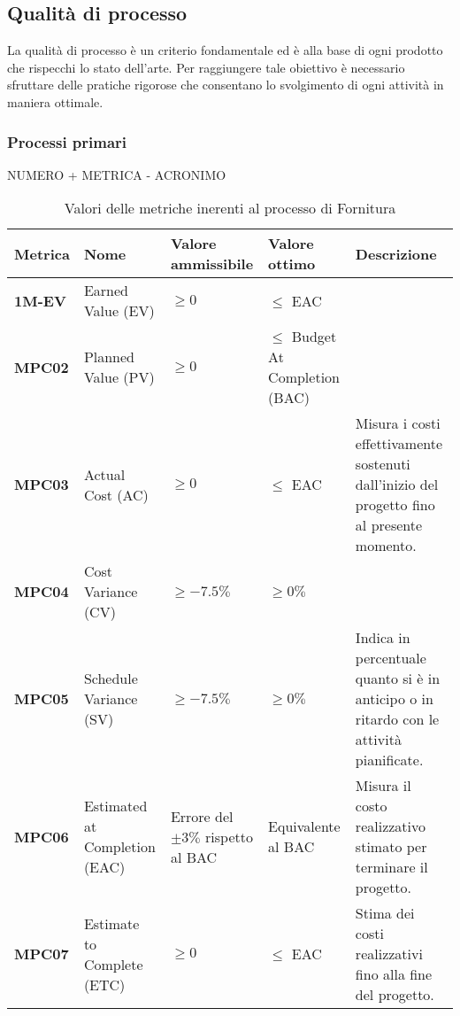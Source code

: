 \documentclass[italian,12pt]{article} %
\begin{document}
\subsection{Qualità di processo}
La qualità di processo è un criterio fondamentale ed è alla base di ogni prodotto
che rispecchi lo stato dell'arte. Per raggiungere tale obiettivo è necessario 
sfruttare delle pratiche rigorose che consentano lo svolgimento di ogni attività
in maniera ottimale.

\subsubsection{Processi primari}


NUMERO + METRICA - ACRONIMO

\begin{table}[h!]
    \centering
    \begin{tabularx}{\textwidth}{|X|X|X|X|X|} 
		\hline
		\textbf{Metrica} 	& \textbf{Nome} & \textbf{Valore ammissibile} & \textbf{Valore ottimo}& \textbf{Descrizione}\\  	 
		\hline
		\textbf{1M-EV} 	& Earned Value (EV) 			& $\geq 0$ 						& $\leq$ EAC &  \\
		\hline
		\textbf{MPC02} 	& Planned Value (PV) 			& $\geq 0$ 						& $\leq$ Budget At Completion (BAC) &  \\ 
		\hline
		\textbf{MPC03} 	& Actual Cost (AC) 				& $\geq 0$ 						& $\leq$ EAC &	Misura i costi effettivamente sostenuti dall'inizio del progetto fino al presente momento.\\ 
		\hline
		\textbf{MPC04} 	& Cost Variance (CV) 			& $\geq -7.5\%$ 				& $\geq 0\%$ & \\ 
		\hline
		\textbf{MPC05} 	& Schedule Variance (SV) 		& $\geq -7.5\%$ 				& $\geq 0\%$ &Indica in percentuale quanto si è in anticipo o in ritardo con le attività pianificate.\\ 
		\hline
		\textbf{MPC06} 	& Estimated at Completion (EAC) & Errore del $\pm 3\%$ rispetto al BAC  & Equivalente al BAC & Misura il costo realizzativo stimato per terminare il progetto.\\ 
		\hline
		\textbf{MPC07} 	& Estimate to Complete (ETC)  	& $\geq 0$						 & $\leq$ EAC & Stima dei costi realizzativi fino alla fine del progetto.\\ 
		\hline
    \end{tabularx}
    \caption{ Valori delle metriche inerenti al processo di Fornitura}
    \label{table:1}
\end{table}
\end{document}
